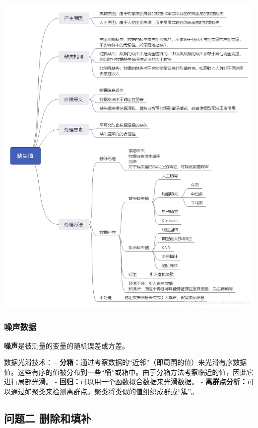 \documentclass[11pt]{article}
\begin{document}
    \includegraphics{02.jpg}

    \hypertarget{ux566aux58f0ux6570ux636e}{%
\subsubsection{噪声数据}\label{ux566aux58f0ux6570ux636e}}

    \textbf{噪声}是被测量的变量的随机误差或方差。

    数据光滑技术： -
\textbf{分箱：}通过考察数据的``近邻''（即周围的值）来光滑有序数据值。这些有序的值被分布到一些``桶''或箱中。由于分箱方法考察临近的值，因此它进行局部光滑。
- \textbf{回归：}可以用一个函数拟合数据来光滑数据。 -
\textbf{离群点分析：}可以通过如聚类来检测离群点。聚类将类似的值组织成群或``簇''。

    \hypertarget{ux95eeux9898ux4e8c-ux5220ux9664ux548cux586bux8865}{%
\subsection{问题二
删除和填补}\label{ux95eeux9898ux4e8c-ux5220ux9664ux548cux586bux8865}}
\end{document}
